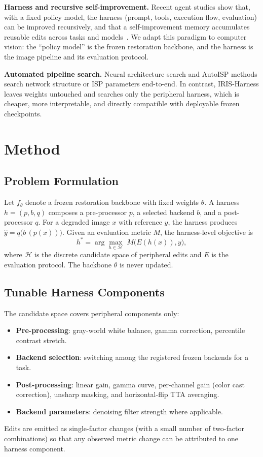 \documentclass[11pt,letterpaper]{article}
\begin{document}
\textbf{Harness and recursive self-improvement.} Recent agent studies show that, with a fixed
policy model, the harness (prompt, tools, execution flow, evaluation) can be improved
recursively, and that a self-improvement memory accumulates reusable edits across tasks and
models~\cite{crsi2026sim}. We adapt this paradigm to computer vision: the ``policy model'' is
the frozen restoration backbone, and the harness is the image pipeline and its evaluation
protocol.

\textbf{Automated pipeline search.} Neural architecture search and AutoISP methods search
network structure or ISP parameters end-to-end. In contrast, IRIS-Harness leaves weights
untouched and searches only the peripheral harness, which is cheaper, more interpretable, and
directly compatible with deployable frozen checkpoints.

\section{Method}
\label{sec:method}

\subsection{Problem Formulation}
Let $f_\theta$ denote a frozen restoration backbone with fixed weights $\theta$. A harness
$h = (p, b, q)$ composes a pre-processor $p$, a selected backend $b$, and a post-processor
$q$. For a degraded image $x$ with reference $y$, the harness produces
$\hat{y} = q\big(b\,(p(x))\big)$. Given an evaluation metric $M$, the harness-level objective
is
\begin{equation}
  h^* = \arg\max_{h \in \mathcal{H}} \; M\big(E(h(x)), y\big),
\end{equation}
where $\mathcal{H}$ is the discrete candidate space of peripheral edits and $E$ is the
evaluation protocol. The backbone $\theta$ is never updated.

\subsection{Tunable Harness Components}
The candidate space covers peripheral components only:
\begin{itemize}[leftmargin=*]
  \item \textbf{Pre-processing}: gray-world white balance, gamma correction, percentile
        contrast stretch.
  \item \textbf{Backend selection}: switching among the registered frozen backends for a task.
  \item \textbf{Post-processing}: linear gain, gamma curve, per-channel gain (color cast
        correction), unsharp masking, and horizontal-flip TTA averaging.
  \item \textbf{Backend parameters}: denoising filter strength where applicable.
\end{itemize}
Edits are emitted as single-factor changes (with a small number of two-factor combinations)
so that any observed metric change can be attributed to one harness component.
\end{document}
